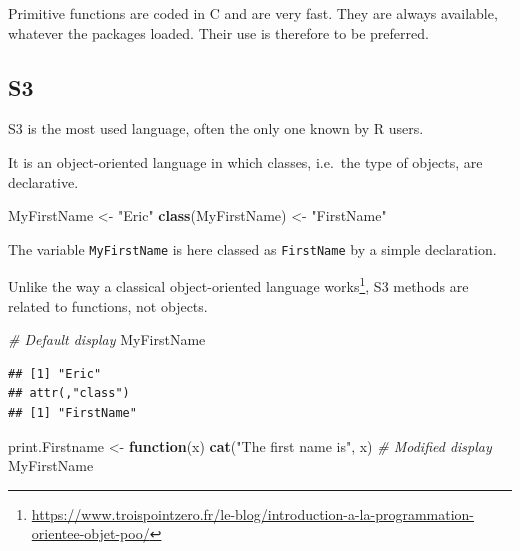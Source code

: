 \documentclass[
  12pt,
  american,
  a4paper,
  extrafontsizes,onecolumn,openright
  ]{memoir}
\newenvironment{Shaded}{\begin{snugshade}}{\end{snugshade}}
\newcommand{\CommentTok}[1]{\textcolor[rgb]{0.56,0.35,0.01}{\textit{#1}}}
\newcommand{\ControlFlowTok}[1]{\textcolor[rgb]{0.13,0.29,0.53}{\textbf{#1}}}
\newcommand{\FunctionTok}[1]{\textcolor[rgb]{0.13,0.29,0.53}{\textbf{#1}}}
\newcommand{\NormalTok}[1]{#1}
\newcommand{\OtherTok}[1]{\textcolor[rgb]{0.56,0.35,0.01}{#1}}
\newcommand{\StringTok}[1]{\textcolor[rgb]{0.31,0.60,0.02}{#1}}
\begin{document}
Primitive functions are coded in C and are very fast.
They are always available, whatever the packages loaded.
Their use is therefore to be preferred.

\subsection{S3}\label{sec:S3}

S3 is the most used language, often the only one known by R users.

It is an object-oriented language in which classes, i.e.~the type of objects, are declarative.

\scriptsize

\begin{Shaded}
\begin{Highlighting}[]
\NormalTok{MyFirstName }\OtherTok{\textless{}{-}} \StringTok{"Eric"}
\FunctionTok{class}\NormalTok{(MyFirstName) }\OtherTok{\textless{}{-}} \StringTok{"FirstName"}
\end{Highlighting}
\end{Shaded}

\normalsize

The variable \texttt{MyFirstName} is here classed as \texttt{FirstName} by a simple declaration.

Unlike the way a classical object-oriented language works\footnote{\url{https://www.troispointzero.fr/le-blog/introduction-a-la-programmation-orientee-objet-poo/}}, S3 methods are related to functions, not objects.

\scriptsize

\begin{Shaded}
\begin{Highlighting}[]
\CommentTok{\# Default display}
\NormalTok{MyFirstName}
\end{Highlighting}
\end{Shaded}

\begin{verbatim}
## [1] "Eric"
## attr(,"class")
## [1] "FirstName"
\end{verbatim}

\begin{Shaded}
\begin{Highlighting}[]
\NormalTok{print.Firstname }\OtherTok{\textless{}{-}} \ControlFlowTok{function}\NormalTok{(x) }\FunctionTok{cat}\NormalTok{(}\StringTok{"The first name is"}\NormalTok{, x) }
\CommentTok{\# Modified display}
\NormalTok{MyFirstName}
\end{Highlighting}
\end{Shaded}
\end{document}
